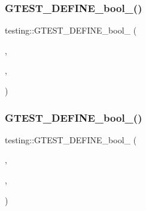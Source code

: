 \subsubsection{\texorpdfstring{G\+T\+E\+S\+T\+\_\+\+D\+E\+F\+I\+N\+E\+\_\+bool\+\_\+()}{GTEST\_DEFINE\_bool\_()}\hspace{0.1cm}{\footnotesize\ttfamily [5/9]}}
{\footnotesize\ttfamily testing\+::\+G\+T\+E\+S\+T\+\_\+\+D\+E\+F\+I\+N\+E\+\_\+bool\+\_\+ (\begin{DoxyParamCaption}\item[{list\+\_\+tests}]{,  }\item[{false}]{,  }\item[{\char`\"{}List all tests without running them.\char`\"{}}]{ }\end{DoxyParamCaption})}

\mbox{\label{namespacetesting_a766fcba2ec951940e528276919a5d22f}} 
\subsubsection{\texorpdfstring{G\+T\+E\+S\+T\+\_\+\+D\+E\+F\+I\+N\+E\+\_\+bool\+\_\+()}{GTEST\_DEFINE\_bool\_()}\hspace{0.1cm}{\footnotesize\ttfamily [6/9]}}
{\footnotesize\ttfamily testing\+::\+G\+T\+E\+S\+T\+\_\+\+D\+E\+F\+I\+N\+E\+\_\+bool\+\_\+ (\begin{DoxyParamCaption}\item[{print\+\_\+time}]{,  }\item[{\hyperlink{namespacetesting_1_1internal_a67132cdce23fb71b6c38ee34ef81eb4c}{internal\+::\+Bool\+From\+G\+Test\+Env}(\char`\"{}print\+\_\+time\char`\"{}, true)}]{,  }\item[{\char`\"{}True iff \char`\"{} G\+T\+E\+S\+T\+\_\+\+N\+A\+M\+E\+\_\+ \char`\"{} should display elapsed time in text output.\char`\"{}}]{ }\end{DoxyParamCaption})}

\mbox{\label{namespacetesting_a60ef38aa9d1437f0d7818181897af8ef}} 

